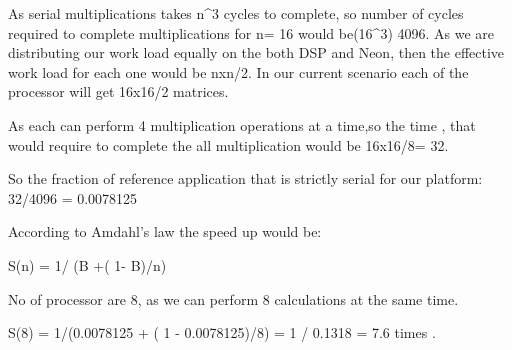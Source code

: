 As serial multiplications takes n^3 cycles to complete, so number of cycles required to complete multiplications  for n= 16  would be(16^3) 4096.
As  we are distributing our work load equally on the both DSP and Neon,  then the effective work load for each one would be nxn/2. In our current scenario each of the processor will get 16x16/2 matrices.

As each can perform 4 multiplication operations at a time,so the time , that would require to complete the  all multiplication would be 16x16/8=  32. 

So the fraction  of reference application that is strictly serial for our platform: 32/4096 = 0.0078125

According to Amdahl's law the speed up would be:

S(n) = 1/ (B +( 1- B)/n) 

No of processor are 8, as we can perform 8 calculations at the same time. 

S(8) = 1/(0.0078125 + ( 1 - 0.0078125)/8) = 1 / 0.1318 = 7.6 times . 

 
